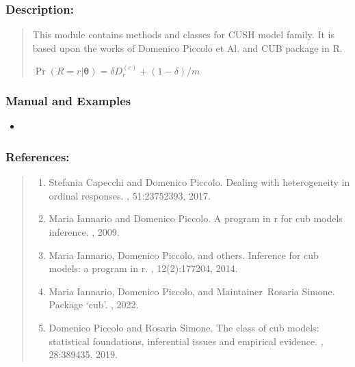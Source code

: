 \documentclass[letterpaper,10pt,english]{sphinxmanual}
\begin{document}
\subsubsection{Description:}
\label{\detokenize{cubmods:id419}}\begin{quote}

\sphinxAtStartPar
This module contains methods and classes
for CUSH model family.
It is based upon the works of Domenico
Piccolo et Al. and CUB package in R.

\sphinxAtStartPar
\(\Pr(R=r|\pmb \theta) = \delta D_r^{(c)} + (1 - \delta)/m\)
\end{quote}


\subsubsection{Manual and Examples}
\label{\detokenize{cubmods:id420}}\begin{itemize}
\item {} 
\sphinxAtStartPar
{}

\end{itemize}


\subsubsection{References:}
\label{\detokenize{cubmods:id421}}\begin{quote}
\begin{enumerate}
%
\setcounter{enumi}{0}
\item {} 
\sphinxAtStartPar
Stefania Capecchi and Domenico Piccolo. Dealing with heterogeneity in ordinal responses. , 51:2375\textendash{}2393, 2017.

\item {} 
\sphinxAtStartPar
Maria Iannario and Domenico Piccolo. A program in r for cub models inference. , 2009.

\item {} 
\sphinxAtStartPar
Maria Iannario, Domenico Piccolo, and others. Inference for cub models: a program in r. , 12(2):177\textendash{}204, 2014.

\item {} 
\sphinxAtStartPar
Maria Iannario, Domenico Piccolo, and Maintainer Rosaria Simone. Package ‘cub’. , 2022.

\item {} 
\sphinxAtStartPar
Domenico Piccolo and Rosaria Simone. The class of cub models: statistical foundations, inferential issues and empirical evidence. , 28:389\textendash{}435, 2019.

\end{enumerate}
\end{quote}
\end{document}
